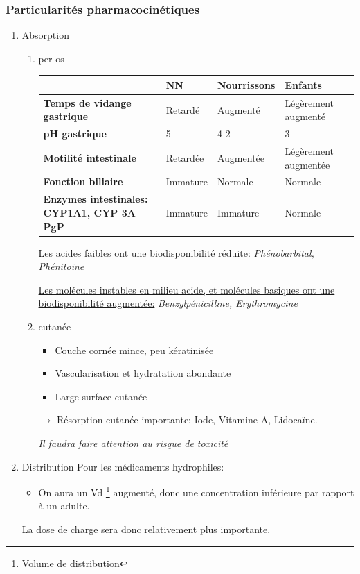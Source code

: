 \documentclass[11pt]{article}
\begin{document}
\subsubsection{Particularités pharmacocinétiques}
\label{sec:orgebb8af5}
\begin{enumerate}
\item Absorption
\label{sec:org1a849c3}
\begin{enumerate}
\item per os
\label{sec:org9a3afec}
\begin{center}
\begin{tabular}{llll}
 & NN & Nourrissons & Enfants\\
\hline
\textbf{Temps de vidange gastrique} & Retardé & Augmenté & Légèrement augmenté\\
\textbf{pH gastrique} & 5 & 4-2 & 3\\
\textbf{Motilité intestinale} & Retardée & Augmentée & Légèrement augmentée\\
\textbf{Fonction biliaire} & Immature & Normale & Normale\\
\textbf{Enzymes intestinales: CYP1A1, CYP 3A PgP} & Immature & Immature & Normale\\
\end{tabular}
\end{center}
\uline{Les acides faibles ont une biodisponibilité réduite:} \emph{Phénobarbital, Phénitoïne}

\uline{Les molécules instables en milieu acide, et molécules basiques  ont une biodisponibilité augmentée:} \emph{Benzylpénicilline, Erythromycine}
\item cutanée
\label{sec:orgace1d53}
\begin{itemize}
\item Couche cornée mince, peu kératinisée
\item Vascularisation et hydratation abondante
\item Large surface cutanée
\end{itemize}
\(\to\) Résorption cutanée importante: Iode, Vitamine A, Lidocaïne.

\emph{Il faudra faire attention au risque de toxicité}
\end{enumerate}
\item Distribution
\label{sec:orge635646}
Pour les médicaments hydrophiles:
\begin{itemize}
\item On aura un Vd \footnote{Volume de distribution} augmenté, donc une concentration inférieure par rapport à un adulte.
\end{itemize}
La dose de charge sera donc relativement plus importante.


\end{enumerate}
\end{document}
